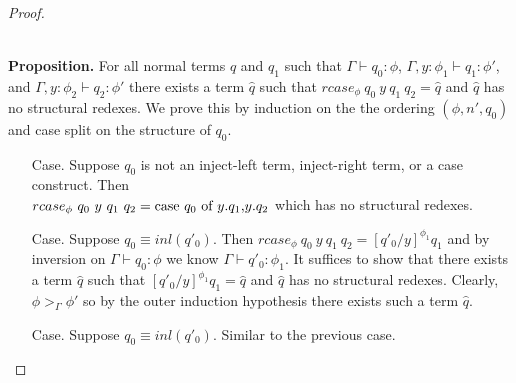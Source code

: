 \begin{proof}
\begin{itemize}
\begin{itemize}
    \ \\
    {\bf Proposition.} For all normal terms $q$ and $q_1$ such that 
    $\Gamma \vdash q_0:\phi$, $\Gamma, y:\phi_1 \vdash q_1:\phi'$, 
    and $\Gamma, y:\phi_2 \vdash q_2:\phi'$ there exists a term $\hat{q}$ such that 
    $rcase_{\phi}\ q_0\ y\ q_1\ q_2 = \hat{q}$ and $\hat{q}$ has no structural redexes.
    We prove this by induction on the the ordering $(\phi, n', q_0)$ and case split on the structure of $q_0$.
    \begin{itemize}
    \item[Case.] Suppose $q_0$ is not an inject-left term, inject-right term, or a case construct.  Then\\
      $rcase_{\phi}\ q_0\ y\ q_1\ q_2 = \mbox{case}\ q_0\ \text{of}\ y\text{.}q_1\text{,}y\text{.}q_2$ which has no structural redexes.
      
    \item[Case.] Suppose $q_0 \equiv inl(q'_0)$.  Then $rcase_{\phi}\ q_0\ y\ q_1\ q_2 = [q'_0/y]^{\phi_1} q_1$ and
      by inversion on $\Gamma \vdash q_0:\phi$ we know $\Gamma \vdash q'_0:\phi_1$.  It suffices to show that there
      exists a term $\hat{q}$ such that $[q'_0/y]^{\phi_1} q_1 = \hat{q}$  and $\hat{q}$ has no structural redexes.
      Clearly, $\phi >_{\Gamma} \phi'$ so by the outer induction hypothesis there exists such a term $\hat{q}$.
      
    \item[Case.] Suppose $q_0 \equiv inl(q'_0)$.  Similar to the previous case.
      

\end{itemize}
\end{itemize}
\end{itemize}
\end{proof}
